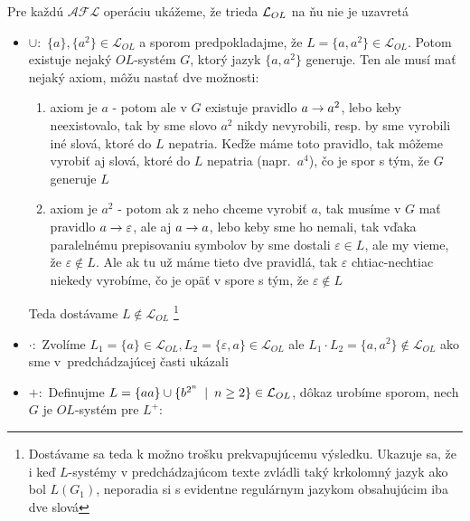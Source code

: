\begin{dokaz}
    Pre každú $\mathcal{AFL}$ operáciu ukážeme, že trieda
    $\mathcal{L}_{OL}$ na ňu nie je uzavretá

    \begin{itemize}
    \item $\cup :$ $\{a\},\{a^{2}\}\in\mathcal{L}_{OL}$ a sporom
        predpokladajme, že $L=\{a,a^{2}\}\in\mathcal{L}_{OL}$. Potom
        existuje nejaký $OL$-systém $G$, ktorý jazyk $\{a,a^{2}\}$
        generuje. Ten ale musí mať nejaký axiom, môžu nastať dve možnosti:

        \begin{enumerate}
        \item axiom je $a$ - potom ale v $G$ existuje pravidlo $a\rightarrow
            a^{2}$, lebo keby neexistovalo, tak by sme slovo $a^{2}$ nikdy
            nevyrobili, resp. by sme vyrobili iné slová, ktoré do $L$
            nepatria. Keďže máme toto pravidlo, tak môžeme vyrobiť aj slová,
            ktoré do $L$ nepatria \mbox{(napr. $a^{4}$)}, čo je spor s tým, že
            $G$ generuje $L$

        \item axiom je $a^{2}$ - potom ak z neho chceme vyrobiť $a$, tak
            musíme v $G$ mať pravidlo $a\rightarrow\varepsilon$, ale aj $a\rightarrow a$, lebo
            keby sme ho nemali, tak vďaka paralelnému prepisovaniu symbolov by
            sme dostali $\varepsilon\in L$, ale my vieme, že
            $\varepsilon\not\in L$. Ale ak tu už máme tieto dve pravidlá, tak
            $\varepsilon$ chtiac-nechtiac niekedy vyrobíme, čo je opäť v spore
            s tým, že $\varepsilon\not\in L$
        \end{enumerate}

        Teda dostávame $L\not\in\mathcal{L}_{OL}$ \footnote{Dostávame sa
        teda k možno trošku prekvapujúcemu výsledku. Ukazuje sa, že i keď
        $L$-systémy v predchádzajúcom texte zvládli taký krkolomný jazyk
        ako bol $L(G_{1})$, neporadia si s evidentne regulárnym jazykom
        obsahujúcim iba dve slová}

    \item $\cdot :$ Zvolíme $L_{1}=\{a\}\in\mathcal{L}_{OL},
        L_{2}=\{\varepsilon,a\}\in\mathcal{L}_{OL}$ ale $L_{1}\cdot
        L_{2}=\{a,a^{2}\}\not\in\mathcal{L}_{OL}$ ako sme \mbox{v
        predchádzajúcej} časti ukázali

    \item $+ :$ Definujme $L=\{aa\}\cup\{b^{2^{n}}\enspace |\enspace
        n\geq2\}\in\mathcal{L}_{OL}$, dôkaz urobíme sporom, nech $G$ je
        $OL$-systém pre $L^{+}$:


\end{itemize}
\end{dokaz}
